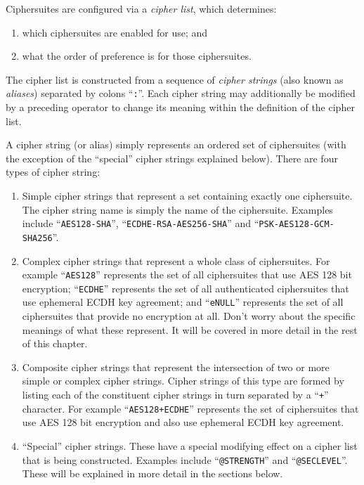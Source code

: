 Ciphersuites are configured via a \emph{cipher list}, which determines:
\begin{enumerate}
\item which ciphersuites are enabled for use; and
\item what the order of preference is for those ciphersuites.
\end{enumerate}

The cipher list is constructed from a sequence of \emph{cipher strings} (also
known as \emph{aliases}) separated by colons ``\verb!:!''. Each cipher string
may additionally be modified by a preceding operator to change its meaning
within the definition of the cipher list.

A cipher string (or alias) simply represents an ordered set of ciphersuites
(with the exception of the ``special'' cipher strings explained below).
There are four types of cipher string:
\begin{enumerate}
\item Simple cipher strings that represent a set containing exactly one
ciphersuite. The cipher string name is simply the name of the ciphersuite. Examples
include ``\verb!AES128-SHA!'', ``\verb!ECDHE-RSA-AES256-SHA!'' and
``\verb!PSK-AES128-GCM-SHA256!''.
\item Complex cipher strings that represent a whole class of ciphersuites. For
example ``\verb!AES128!'' represents the set of all ciphersuites that use AES
128 bit encryption; ``\verb!ECDHE!'' represents the set of all authenticated
ciphersuites that use ephemeral ECDH key agreement; and ``\verb!eNULL!''
represents the set of all ciphersuites that provide no encryption at all. Don't
worry about the specific meanings of what these represent. It will be covered in
more detail in the rest of this chapter.
\item Composite cipher strings that represent the intersection of two or more
simple or complex cipher strings. Cipher strings of this type are formed by
listing each of the constituent cipher strings in turn separated by a
``\verb!+!'' character. For example ``\verb!AES128+ECDHE!'' represents the set
of ciphersuites that use AES 128 bit encryption and also use ephemeral ECDH key
agreement.
\item ``Special'' cipher strings. These have a special modifying effect on a
cipher list that is being constructed. Examples include ``\verb!@STRENGTH!'' and
``\verb!@SECLEVEL!''. These will be explained in more detail in the sections
below.
\end{enumerate}

